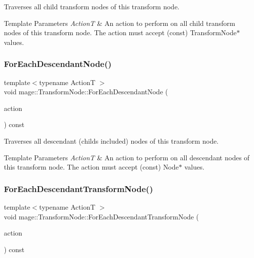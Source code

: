 Traverses all child transform nodes of this transform node.


\begin{DoxyTemplParams}{Template Parameters}
{\em ActionT} & An action to perform on all child transform nodes of this transform node. The action must accept ({\ttfamily const}) {\ttfamily Transform\+Node$\ast$} values. \\
\hline
\end{DoxyTemplParams}
\hypertarget{structmage_1_1_transform_node_a696d23bd936d3c3f880cb8b5cfd54d80}{}\label{structmage_1_1_transform_node_a696d23bd936d3c3f880cb8b5cfd54d80} 
\subsubsection{\texorpdfstring{For\+Each\+Descendant\+Node()}{ForEachDescendantNode()}}
{\footnotesize\ttfamily template$<$typename ActionT $>$ \\
void mage\+::\+Transform\+Node\+::\+For\+Each\+Descendant\+Node (\begin{DoxyParamCaption}\item[{ActionT}]{action }\end{DoxyParamCaption}) const\hspace{0.3cm}{\ttfamily [private]}}

Traverses all descendant (childs included) nodes of this transform node.


\begin{DoxyTemplParams}{Template Parameters}
{\em ActionT} & An action to perform on all descendant nodes of this transform node. The action must accept ({\ttfamily const}) {\ttfamily Node$\ast$} values. \\
\hline
\end{DoxyTemplParams}
\hypertarget{structmage_1_1_transform_node_a7a052715d9591defa06e494017539711}{}\label{structmage_1_1_transform_node_a7a052715d9591defa06e494017539711} 
\subsubsection{\texorpdfstring{For\+Each\+Descendant\+Transform\+Node()}{ForEachDescendantTransformNode()}}
{\footnotesize\ttfamily template$<$typename ActionT $>$ \\
void mage\+::\+Transform\+Node\+::\+For\+Each\+Descendant\+Transform\+Node (\begin{DoxyParamCaption}\item[{ActionT}]{action }\end{DoxyParamCaption}) const\hspace{0.3cm}{\ttfamily [private]}}

